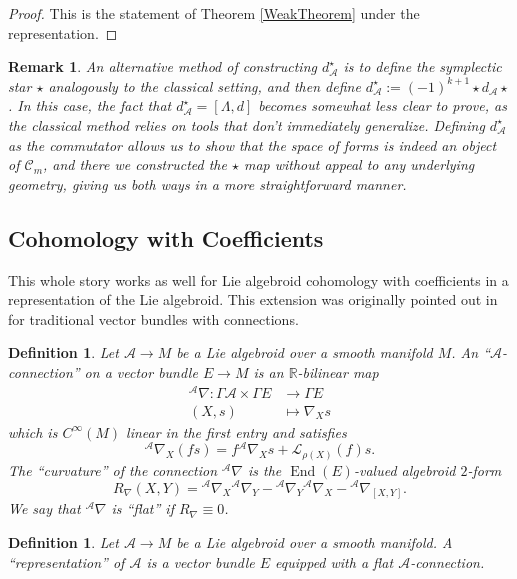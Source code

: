 \documentclass{amsart}
\newcommand{\R}{\mathbb{R}}
\newcommand{\ra}{\rightarrow}
\newtheorem{definition}[theorem]{Definition}
\newtheorem{remark}[theorem]{Remark}
\newcommand{\A}{\mathcal{A}}
\theoremstyle{definition}
\DeclareMathOperator{\End}{End}
\begin{document}
\begin{proof}
    This is the statement of Theorem \ref{WeakTheorem} under the representation.
\end{proof}
\begin{remark}
    An alternative method of constructing $d_\A^\star$ is to define the symplectic star $\star$ analogously to the classical setting, and then define $d_\A^\star:=(-1)^{k+1}\star d_\A \star$. In this case, the fact that $d_\A^\star = [\Lambda,d]$ becomes somewhat less clear to prove, as the classical method relies on tools that don't immediately generalize. Defining $d_\A^\star$ as the commutator allows us to show that the space of forms is indeed an object of $\mathscr{C}_m$, and there we constructed the $\star$ map without appeal to any underlying geometry, giving us both ways in a more straightforward manner.
\end{remark}
\subsection{Cohomology with Coefficients}
This whole story works as well for Lie algebroid cohomology with coefficients in a representation of the Lie algebroid. This extension was originally pointed out in \cite{YAN1996143} for traditional vector bundles with connections. 
\begin{definition}
   Let $\A \ra M$ be a Lie algebroid over a smooth manifold $M$. An ``$\A$-connection'' on a vector bundle $E \ra M$ is an $\R$-bilinear map
   \begin{align*}
       {}^\A\nabla:\Gamma \A \times \Gamma E &\ra \Gamma E \\
       (X ,s ) &\mapsto \nabla_X s
   \end{align*}
   which is $C^\infty(M)$ linear in the first entry and satisfies
   \begin{equation*}
       {}^\A\nabla_X (fs) = f {}^\A\nabla_X s + \mathcal{L}_{\rho(X)}(f) s   .
       \end{equation*}
     The ``curvature'' of the connection ${}^\A \nabla$ is the $\End(E)$-valued algebroid $2$-form
     \begin{equation*}
         R_\nabla(X , Y) = {}^\A \nabla_X {}^\A \nabla_Y - {}^\A \nabla_Y {}^\A \nabla _X - {}^\A \nabla_{[X,Y]}.
     \end{equation*}
     We say that ${}^\A \nabla$ is ``flat'' if $ R_ \nabla \equiv 0$.
\end{definition}
\begin{definition}
    Let $\A \ra M$ be a Lie algebroid over a smooth manifold. A ``representation'' of $\A$ is a vector bundle $E$ equipped with a flat $\A$-connection.
\end{definition}
\end{document}
